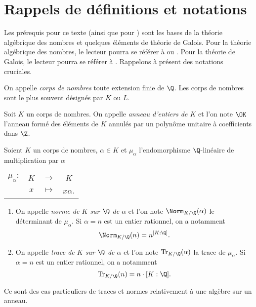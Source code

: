 \section*{Rappels de définitions et notations}\label{section-notations}

Les prérequis pour ce texte (ainsi que pour \cite{article}) sont les bases de la théorie algébrique des nombres et quelques éléments de théorie de Galois. Pour la théorie algébrique des nombres, le lecteur pourra se référer à \cite[ch. II, III, V et VI]{Samuel} ou \cite[ch. II, III et IV]{Kraus}. Pour la théorie de Galois, le lecteur pourra se référer à \cite[ch. XXIII à XVII]{GrandCombat}. Rappelons à présent des notations cruciales.

\begin{rappel}
	On appelle \emph{corps de nombres} toute extension finie de $\Q$. Les corps de nombres sont le plus souvent désignés par $K$ ou $L$.
\end{rappel}

\begin{rappel}
	Soit $K$ un corps de nombres. On appelle \emph{anneau d'entiers de $K$} et l'on note $\OK$ l'anneau formé des éléments de $K$ annulés par un polynôme unitaire à coefficients dans $\Z$.
\end{rappel}

\begin{rappel} Soient $K$ un corps de nombres, $\alpha\in K$ et $\mu_\alpha$ l'endomorphisme $\Q$-linéaire de multiplication par $\alpha$ 
\begin{center}
	\begin{tabular}{rccc}
		$\mu_\alpha : $ & $K$ & $\longrightarrow$ & $K$ \\
		& $x$	& $\longmapsto$ & $x\alpha$.
	\end{tabular}
\end{center}

\begin{enumerate}
	\item On appelle \emph{norme de $K$ sur $\Q$ de $\alpha$} et l'on note $\Norm_{K/\Q}(\alpha)$ le déterminant de $\mu_\alpha$. Si $\alpha=n$ est un entier rationnel, on a notamment \[\Norm_{K/\Q}(n) = n^{[K : \Q]}.\]
	\item On appelle \emph{trace de $K$ sur $\Q$ de $\alpha$} et l'on note $\mathrm{Tr}_{K/\Q}(\alpha)$ la trace de $\mu_\alpha$. Si $\alpha= n$ est un entier rationnel, on a notamment \[\mathrm{Tr}_{K/\Q}(n) = n\cdot{[K : \Q]}.\]
\end{enumerate}

	Ce sont des cas particuliers de traces et normes relativement à une algèbre sur un anneau.
\end{rappel}


